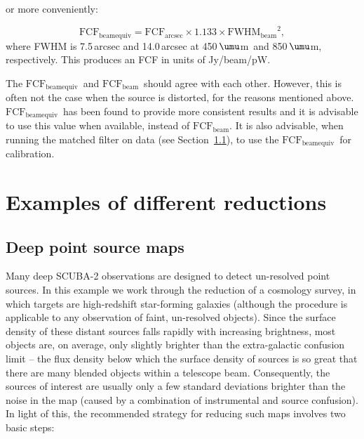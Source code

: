 \documentclass[twoside,11pt]{article}
\newcommand{\micron}{\mbox{\,${\umu}$m}}            %
\newcommand{\xlabel}[1]{}
\renewcommand{\_}{\texttt{\symbol{95}}}
\newcommand{\fcfbe}{$\mathrm{FCF_{beamequiv}}$}
\newcommand{\fcfb}{$\mathrm{FCF_{beam}}$}
\begin{document}
\begin{itemize}
 or more conveniently:

\begin{equation}
\mathrm{FCF_{beamequiv}} = \mathrm{FCF_{arcsec}} \times 1.133 \times
\mathrm{FWHM_{beam}}^2,
\end{equation}
where FWHM is 7.5\,arcsec and 14.0\,arcsec at 450\micron\ and
850\micron, respectively. This produces an FCF in units of
Jy/beam/pW.

The \fcfbe\ and \fcfb\ should agree
with each other. However, this is often not the case when the source
is distorted, for the reasons mentioned
above. \fcfbe\ has been found to provide more
consistent results and it is advisable to use this value when
available, instead of \fcfb. It is also advisable,
when running the matched filter on data (see
Section~\ref{sec:cosmology}), to use the \fcfbe\
for calibration.

\end{itemize}


\section{\xlabel{Examples}Examples of different reductions}
\label{sec:eg}

\subsection{\xlabel{Cosmology}Deep point source maps}
\label{sec:cosmology}

Many deep SCUBA-2 observations are designed to detect un-resolved
point sources. In this example we work through the reduction of a
cosmology survey, in which targets are high-redshift star-forming
galaxies (although the procedure is applicable to any observation of
faint, un-resolved objects).  Since the surface density of these
distant sources falls rapidly with increasing brightness, most objects
are, on average, only slightly brighter than the extra-galactic
confusion limit -- the flux density below which the surface density of
sources is so great that there are many blended objects within a
telescope beam. Consequently, the sources of interest are usually only
a few standard deviations brighter than the noise in the map (caused
by a combination of instrumental and source confusion). In light of
this, the recommended strategy for reducing such maps involves two
basic steps:
\end{document}
